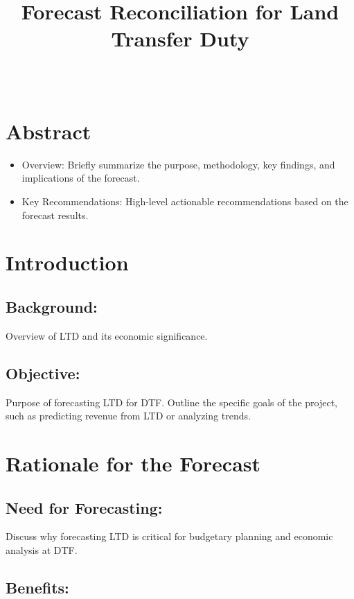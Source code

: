 \documentclass[11pt,a4paper,]{article}
\title{Forecast Reconciliation for Land Transfer Duty}
\author{\sf{\Large\textbf{Hoang Do}\\\large Nobel Prize, PhD\\[0.5cm]}}
\date{\sf\Date~\Month~\Year}
\makeatletter
\providecommand{\tightlist}{%
  \setlength{\itemsep}{0pt}\setlength{\parskip}{0pt}}
\def\titlepage{\front{\expandafter{\@title}}{\@author}{\@organization}}
\makeatother
\begin{document}
\titlepage

{
\setcounter{tocdepth}{2}
\tableofcontents
}
\section{Abstract}\label{abstract}

\begin{itemize}
\tightlist
\item
  Overview: Briefly summarize the purpose, methodology, key findings, and implications of the forecast.
\item
  Key Recommendations: High-level actionable recommendations based on the forecast results.
\end{itemize}

\section{Introduction}\label{introduction}

\subsection{Background:}\label{background}

Overview of LTD and its economic significance.

\subsection{Objective:}\label{objective}

Purpose of forecasting LTD for DTF. Outline the specific goals of the project, such as predicting revenue from LTD or analyzing trends.

\section{Rationale for the Forecast}\label{rationale-for-the-forecast}

\subsection{Need for Forecasting:}\label{need-for-forecasting}

Discuss why forecasting LTD is critical for budgetary planning and economic analysis at DTF.

\subsection{Benefits:}\label{benefits}
\end{document}
